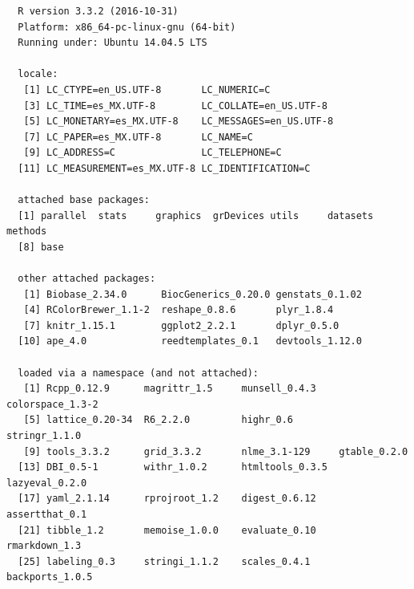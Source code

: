\documentclass[12pt,twoside]{reedthesis}
\begin{document}
  \begin{verbatim}
  R version 3.3.2 (2016-10-31)
  Platform: x86_64-pc-linux-gnu (64-bit)
  Running under: Ubuntu 14.04.5 LTS
  
  locale:
   [1] LC_CTYPE=en_US.UTF-8       LC_NUMERIC=C              
   [3] LC_TIME=es_MX.UTF-8        LC_COLLATE=en_US.UTF-8    
   [5] LC_MONETARY=es_MX.UTF-8    LC_MESSAGES=en_US.UTF-8   
   [7] LC_PAPER=es_MX.UTF-8       LC_NAME=C                 
   [9] LC_ADDRESS=C               LC_TELEPHONE=C            
  [11] LC_MEASUREMENT=es_MX.UTF-8 LC_IDENTIFICATION=C       
  
  attached base packages:
  [1] parallel  stats     graphics  grDevices utils     datasets  methods  
  [8] base     
  
  other attached packages:
   [1] Biobase_2.34.0      BiocGenerics_0.20.0 genstats_0.1.02    
   [4] RColorBrewer_1.1-2  reshape_0.8.6       plyr_1.8.4         
   [7] knitr_1.15.1        ggplot2_2.2.1       dplyr_0.5.0        
  [10] ape_4.0             reedtemplates_0.1   devtools_1.12.0    
  
  loaded via a namespace (and not attached):
   [1] Rcpp_0.12.9      magrittr_1.5     munsell_0.4.3    colorspace_1.3-2
   [5] lattice_0.20-34  R6_2.2.0         highr_0.6        stringr_1.1.0   
   [9] tools_3.3.2      grid_3.3.2       nlme_3.1-129     gtable_0.2.0    
  [13] DBI_0.5-1        withr_1.0.2      htmltools_0.3.5  lazyeval_0.2.0  
  [17] yaml_2.1.14      rprojroot_1.2    digest_0.6.12    assertthat_0.1  
  [21] tibble_1.2       memoise_1.0.0    evaluate_0.10    rmarkdown_1.3   
  [25] labeling_0.3     stringi_1.1.2    scales_0.4.1     backports_1.0.5 
  \end{verbatim}
  
\end{document}
